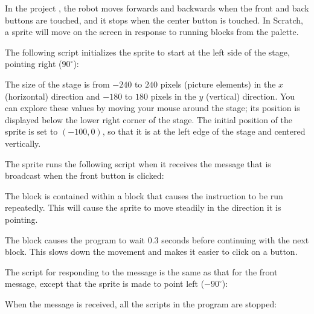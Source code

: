 \label{ch.moving}


In the project , the robot moves forwards and backwards when
the front and back buttons are touched, and it stops when the center
button is touched. In Scratch, a sprite will move on the screen in
response to running blocks from the  palette.

The following script initializes the sprite to start at the left
side of the stage, pointing right ($90^{\circ}$):


The size of the stage is from $-240$ to $240$ pixels (picture elements)
in the $x$ (horizontal) direction and $-180$ to $180$ pixels in the $y$
(vertical) direction. You can explore these values by moving your mouse
around the stage; its position is displayed below the lower right corner
of the stage. The initial position of the  sprite is set to
$(-100,0)$, so that it is at the left edge of the stage and centered
vertically.

The sprite runs the following script when it receives the message
 that is broadcast when the front button is clicked:


The block  is contained within a
 block that causes the instruction to be run
repeatedly. This will cause the sprite to move steadily in the direction
it is pointing.

The  block causes the program to wait 0.3 seconds before
continuing with the next block. This slows down the movement and makes
it easier to click on a button.

The script for responding to the  message is the same as that
for the front message, except that the sprite is made to point left
($-90^{\circ}$):


When the  message is received, all the scripts in the
program are stopped:



